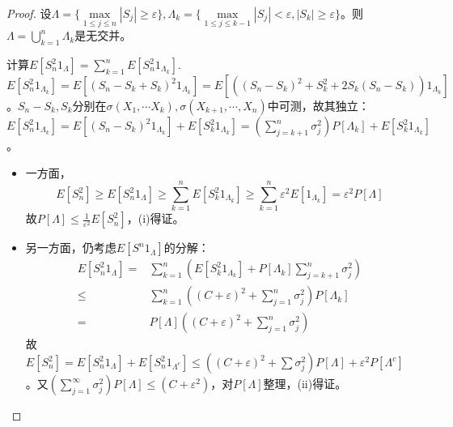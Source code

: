 \documentclass{ctexart}
\begin{document}
\begin{proof}
  设$\Lambda=\{\max\limits_{1\leq j\leq n}|S_{j}|\geq\varepsilon\},\Lambda_{k}=\{\max\limits_{1\leq j\leq k-1}|S_{j}|<\varepsilon, |S_{k}|\geq \varepsilon\}$。则$\Lambda=\bigcup_{k=1}^{n}\Lambda_{k}$是无交并。

  计算$E[S_{n}^{2}1_{\Lambda}]=\sum_{k=1}^{n}E[S_{n}^{2}1_{\Lambda_{k}}]$. $E[S_{n}^{2}1_{\Lambda_{k}}]=E[(S_{n}-S_{k}+S_{k})^{2}1_{\Lambda_{k}}]=E[((S_{n}-S_{k})^{2}+S_{k}^{2}+2S_{k}(S_{n}-S_{k}))1_{\Lambda_{k}}]$。$S_{n}-S_{k},S_{k}$分别在$\sigma(X_{1},\cdots X_{k}),\sigma(X_{k+1},\cdots,X_{n})$中可测，故其独立：$E[S_{n}^{2}1_{\Lambda_{k}}]=E[(S_{n}-S_{k})^{2}1_{\Lambda_{k}}]+E[S_{k}^{2}1_{\Lambda_{k}}]=(\sum_{j=k+1}^{n}\sigma_{j}^{2})P[\Lambda_{k}]+E[S^{2}_{k}1_{\Lambda_{k}}]$。
  \begin{itemize}
  \item 一方面，\[E[S_{n}^{2}]\geq E[S_{n}^{2}1_{\Lambda}]\geq \sum_{k=1}^{n}E[S_{k}^{2}1_{\Lambda_{k}}]\geq \sum_{k=1}^{n}\varepsilon^{2}E[1_{\Lambda_{k}}]=\varepsilon^{2}P[\Lambda]\]
  故$P[\Lambda]\leq\frac{1}{\varepsilon^{2}}E[S_{n}^{2}]$，(i)得证。
\item 另一方面，仍考虑$E[S^{n}1_{\Lambda}]$的分解：
  \begin{align*}
    E[S_{n}^{2}1_{\Lambda}]=&\sum_{k=1}^{n}(E[S_{k}^{2}1_{\Lambda_{k}}]+P[\Lambda_{k}]\sum_{j=k+1}^{n}\sigma_{j}^{2})\\
    \leq &\sum_{k=1}^{n}((C+\varepsilon)^{2}+\sum_{j=1}^{n}\sigma_{j}^{2})P[\Lambda_{k}]\\
    =&P[\Lambda]((C+\varepsilon)^{2}+\sum_{j=1}^{n}\sigma_{j}^{2})
  \end{align*}
  故$E[S_{n}^{2}]=E[S_{n}^{2}1_{\Lambda}]+E[S_{n}^{2}1_{\Lambda^{c}}]\leq ((C+\varepsilon)^{2}+\sum\sigma_{j}^{2})P[\Lambda]+\varepsilon^{2}P[\Lambda^{c}]$。又$(\sum_{j=1}^{\infty}\sigma_{j}^{2})P[\Lambda]\leq (C+\varepsilon^{2})$，对$P[\Lambda]$整理，(ii)得证。
  \end{itemize}
\end{proof}
\end{document}
